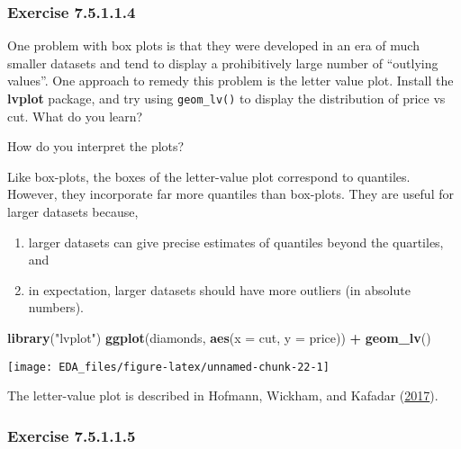 \documentclass[]{book}
\newenvironment{Shaded}{\begin{snugshade}}{\end{snugshade}}
\newcommand{\DataTypeTok}[1]{\textcolor[rgb]{0.13,0.29,0.53}{#1}}
\newcommand{\KeywordTok}[1]{\textcolor[rgb]{0.13,0.29,0.53}{\textbf{#1}}}
\newcommand{\NormalTok}[1]{#1}
\newcommand{\OperatorTok}[1]{\textcolor[rgb]{0.81,0.36,0.00}{\textbf{#1}}}
\newcommand{\StringTok}[1]{\textcolor[rgb]{0.31,0.60,0.02}{#1}}
\providecommand{\tightlist}{%
  \setlength{\itemsep}{0pt}\setlength{\parskip}{0pt}}
\theoremstyle{plain}
\theoremstyle{remark}
\begin{document}
\hypertarget{exercise-7.5.1.1.4}{%
\subsubsection*{\texorpdfstring{Exercise
{7.5.1.1.4}}{Exercise 7.5.1.1.4}}\label{exercise-7.5.1.1.4}}

One problem with box plots is that they were developed in an era of much
smaller datasets and tend to display a prohibitively large number of
``outlying values''. One approach to remedy this problem is the letter
value plot. Install the \textbf{lvplot} package, and try using
\texttt{geom\_lv()} to display the distribution of price vs cut. What do
you learn?

How do you interpret the plots?

Like box-plots, the boxes of the letter-value plot correspond to
quantiles. However, they incorporate far more quantiles than box-plots.
They are useful for larger datasets because,

\begin{enumerate}
\def\labelenumi{\arabic{enumi}.}
\tightlist
\item
  larger datasets can give precise estimates of quantiles beyond the
  quartiles, and
\item
  in expectation, larger datasets should have more outliers (in absolute
  numbers).
\end{enumerate}

\begin{Shaded}
\begin{Highlighting}[]
\KeywordTok{library}\NormalTok{(}\StringTok{"lvplot"}\NormalTok{)}
\KeywordTok{ggplot}\NormalTok{(diamonds, }\KeywordTok{aes}\NormalTok{(}\DataTypeTok{x =}\NormalTok{ cut, }\DataTypeTok{y =}\NormalTok{ price)) }\OperatorTok{+}
\StringTok{  }\KeywordTok{geom_lv}\NormalTok{()}
\end{Highlighting}
\end{Shaded}

\begin{center}\texttt{[image: EDA\_files/figure-latex/unnamed-chunk-22-1]} \end{center}

The letter-value plot is described in Hofmann, Wickham, and Kafadar
(\protect\hyperlink{ref-HofmannWickhamKafadar2017}{2017}).

\hypertarget{exercise-7.5.1.1.5}{%
\subsubsection*{\texorpdfstring{Exercise
{7.5.1.1.5}}{Exercise 7.5.1.1.5}}\label{exercise-7.5.1.1.5}}
\end{document}
